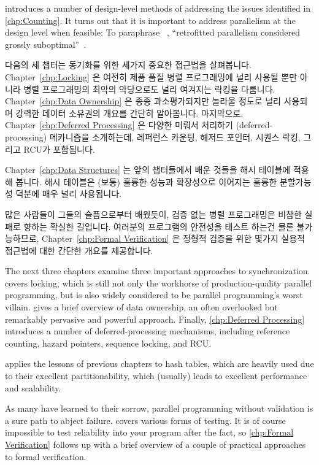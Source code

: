introduces a number of design-level methods of addressing the issues
identified in \cref{chp:Counting}.
It turns out that it is important to address parallelism at
the design level when feasible:
To paraphrase ~\cite{Dijkstra:1968:LEG:362929.362947},
``retrofitted parallelism considered grossly
suboptimal''~\cite{PaulEMcKenney2012HOTPARsuboptimal}.

\fi

다음의 세 챕터는 동기화를 위한 세가지 중요한 접근법을 살펴봅니다.
Chapter~\ref{chp:Locking} 은 여전히 제품 품질 병렬 프로그래밍에 널리 사용될
뿐만 아니라 병렬 프로그래밍의 최악의 악당으로도 널리 여겨지는 락킹을 다룹니다.
Chapter~\ref{chp:Data Ownership} 은 종종 과소평가되지만 놀라울 정도로 널리
사용되며 강력한 데이터 소유권의 개요를 간단히 알아봅니다.
마지막으로, Chapter~\ref{chp:Deferred Processing} 은 다양한 미뤄서 처리하기
(deferred-processing) 메카니즘을 소개하는데, 레퍼런스 카운팅, 해저드 포인터,
시퀀스 락킹, 그리고 RCU가 포함됩니다.

Chapter~\ref{chp:Data Structures} 는 앞의 챕터들에서 배운 것들을 해시 테이블에
적용해 봅니다.  해시 테이블은 (보통) 훌륭한 성능과 확장성으로 이어지는 훌륭한
분할가능성 덕분에 매우 널리 사용됩니다.

많은 사람들이 그들의 슬픔으로부터 배웠듯이, 검증 없는 병렬 프로그래밍은 비참한
실패로 향하는 확실한 길입니다.
여러분의 프로그램의 안전성을 테스트 하는건 물론 불가능하므로,
Chapter~\ref{chp:Formal Verification} 은 정형적 검증을 위한 몇가지 실용적
접근법에 대한 간단한 개요를 제공합니다.

\iffalse

The next three chapters examine three important approaches to
synchronization.
 covers locking, which is still not only the
workhorse of production-quality parallel programming, but is also widely
considered to be parallel programming's worst villain.
 gives a brief overview of data ownership,
an often overlooked but remarkably pervasive and powerful approach.
Finally, \cref{chp:Deferred Processing} introduces a number of
deferred-processing mechanisms, including reference counting,
hazard pointers, sequence locking, and RCU\@.

 applies the lessons of previous
chapters to hash tables, which are heavily used due
to their excellent partitionability, which (usually) leads to excellent
performance and scalability.

As many have learned to their sorrow, parallel programming without
validation is a sure path to abject failure.
 covers various forms of testing.
It is of course impossible to test reliability into your program
after the fact, so \cref{chp:Formal Verification}
follows up with a brief overview of a couple of practical approaches to
formal verification.


